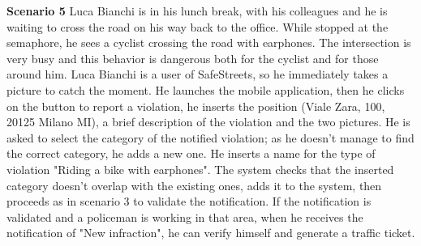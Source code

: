 \begin{description}
    \item \textbf{Scenario 5} \newline
        Luca Bianchi is in his lunch break, with his colleagues and he is waiting to cross the road on his way back to the office. While stopped at the semaphore, he sees a cyclist crossing the road with earphones. The intersection is very busy and this behavior is dangerous both for the cyclist and for those around him. Luca Bianchi is a user of SafeStreets, so he immediately takes a picture to catch the moment. He launches the mobile application, then he clicks on the button to report a violation, he inserts the position (Viale Zara, 100, 20125 Milano MI), a brief description of the violation and the two pictures. He is asked to select the category of the notified violation; as he doesn't manage to find the correct category, he adds a new one. He inserts a name for the type of violation "Riding a bike with earphones". The system checks that the inserted category doesn't overlap with the existing ones, adds it to the system, then proceeds as in scenario 3 to validate the notification. If the notification is validated and a policeman is working in that area, when he receives the notification of "New infraction", he can verify himself and generate a traffic ticket.


\end{description}
